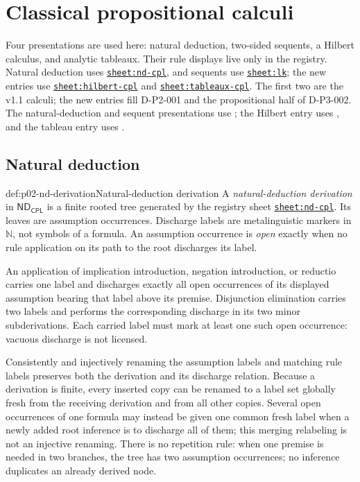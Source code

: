 
\section{Classical propositional calculi}
\label{sec:p02-propositional-calculi}

Four presentations are used here: natural deduction, two-sided sequents,
a Hilbert calculus, and analytic tableaux.  Their rule displays live only in
the registry.  Natural deduction uses
\hyperref[sheet:nd-cpl]{\texttt{sheet:nd-cpl}}, and sequents use
\hyperref[sheet:lk]{\texttt{sheet:lk}}; the new entries use
\hyperref[sheet:hilbert-cpl]{\texttt{sheet:hilbert-cpl}} and
\hyperref[sheet:tableaux-cpl]{\texttt{sheet:tableaux-cpl}}.  The first two
are the v1.1 calculi; the new entries fill D-P2-001 and the propositional half
of D-P3-002.  The natural-deduction and sequent presentations use
\cite{Gentzen1934a,Kleene1952}; the Hilbert entry uses \cite{Mendelson1997},
and the tableau entry uses \cite{Smullyan1968}.

\subsection{Natural deduction}
\label{sec:p02-natural-deduction}

\begin{hbdefinition}{def:p02-nd-derivation}{Natural-deduction derivation}
A \emph{natural-deduction derivation} in
\(\mathsf{ND}_{\mathsf{CPL}}\) is a finite rooted tree generated by the
registry sheet \hyperref[sheet:nd-cpl]{\texttt{sheet:nd-cpl}}.  Its leaves are assumption
occurrences.  Discharge labels are metalinguistic markers in \(\mathbb N\),
not symbols of a formula.  An assumption occurrence is \emph{open} exactly
when no rule application on its path to the root discharges its label.

An application of implication introduction, negation introduction, or
reductio carries one label and discharges exactly all open occurrences of its
displayed assumption bearing that label above its premise.  Disjunction
elimination carries two labels and performs the corresponding discharge in
its two minor subderivations.  Each carried label must mark at least one such
open occurrence: vacuous discharge is not licensed.

Consistently and injectively renaming the assumption labels and matching rule
labels preserves both the derivation and its discharge relation.  Because a
derivation is finite, every inserted copy can be renamed to a label set
globally fresh from the receiving derivation and from all other copies.
Several open occurrences of one formula may instead be given one common
fresh label when a newly added root inference is to discharge all of them;
this merging relabeling is not an injective renaming.  There is no repetition
rule: when one premise is needed in two branches, the tree has two assumption
occurrences; no inference duplicates an already derived node.
\end{hbdefinition}

